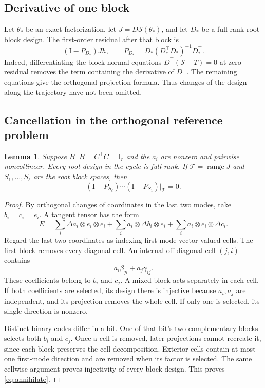 \documentclass[11pt]{article}
\newtheorem{lemma}[theorem]{Lemma}
\theoremstyle{remark}\newtheorem{remark}[theorem]{Remark}
\newcommand{\Id}{\mathrm I}
\newcommand{\Smap}{\mathcal S}
\begin{document}
\subsection{Derivative of one block}
Let $\theta_*$ be an exact factorization, let $J=D\Smap(\theta_*)$, and let $D_*$ be a full-rank root block design. The first-order residual after that block is
\begin{equation}\label{eq:projection}
 (\Id-P_{D_*})Jh,
 \qquad P_{D_*}=D_*(D_*^\top D_*)^{-1}D_*^\top.
\end{equation}
Indeed, differentiating the block normal equations $D^\top(\Smap-T)=0$ at zero residual removes the term containing the derivative of $D^\top$. The remaining equations give the orthogonal projection formula. Thus changes of the design along the trajectory have not been omitted.

\subsection{Cancellation in the orthogonal reference problem}
\begin{lemma}\label{lem:reference}
Suppose $B^\top B=C^\top C=\Id_r$ and the $a_i$ are nonzero and pairwise noncollinear. Every root design in the cycle is full rank. If $\mathcal T=\operatorname{range}J$ and $S_1,\ldots,S_\ell$ are the root block spaces, then
\begin{equation}\label{eq:annihilate}
 (\Id-P_{S_\ell})\cdots(\Id-P_{S_1})\big|_{\mathcal T}=0.
\end{equation}
\end{lemma}
\begin{proof}
By orthogonal changes of coordinates in the last two modes, take $b_i=c_i=e_i$. A tangent tensor has the form
\[
 E=\sum_i\Delta a_i\otimes e_i\otimes e_i
 +\sum_i a_i\otimes\Delta b_i\otimes e_i
 +\sum_i a_i\otimes e_i\otimes\Delta c_i.
\]
Regard the last two coordinates as indexing first-mode vector-valued cells. The first block removes every diagonal cell. An internal off-diagonal cell $(j,i)$ contains
\[
 a_i\beta_{ji}+a_j\gamma_{ij}.
\]
These coefficients belong to $b_i$ and $c_j$. A mixed block acts separately in each cell. If both coefficients are selected, its design there is injective because $a_i,a_j$ are independent, and its projection removes the whole cell. If only one is selected, its single direction is nonzero.

Distinct binary codes differ in a bit. One of that bit's two complementary blocks selects both $b_i$ and $c_j$. Once a cell is removed, later projections cannot recreate it, since each block preserves the cell decomposition. Exterior cells contain at most one first-mode direction and are removed when its factor is selected. The same cellwise argument proves injectivity of every block design. This proves \eqref{eq:annihilate}.
\end{proof}
\end{document}
